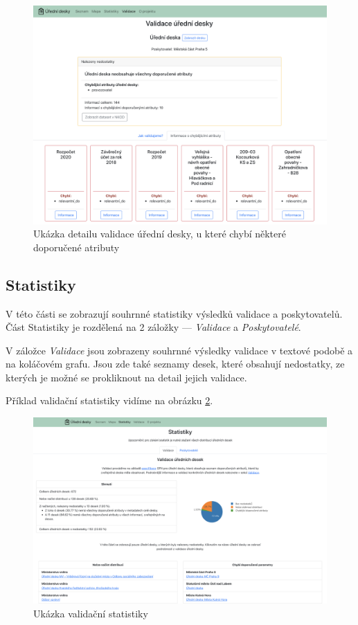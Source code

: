 \begin{figure}
\centering
\includegraphics[width=\textwidth]{cs/obrazky/screenshots/validace_detail_zluty.png}
\caption{Ukázka detailu validace úřední desky, u které chybí některé doporučené atributy}
\label{fig:screen-validace-z}
\end{figure}

\subsection*{Statistiky}\label{statistiky}

V této části se zobrazují souhrnné statistiky výsledků validace a
poskytovatelů. Část Statistiky je rozdělená na 2 záložky --- \textit{Validace} a \textit{Poskytovatelé}.

V záložce \textit{Validace} jsou zobrazeny souhrnné výsledky validace v textové podobě a na koláčovém grafu. Jsou zde také seznamy desek, které obsahují nedostatky, ze kterých je možné se prokliknout na detail jejich validace.

Příklad validační statistiky vidíme na obrázku \ref{fig:screen-stat-val}.

\begin{figure}
\centering
\includegraphics[width=\textwidth]{cs/obrazky/screenshots/statistika_validace.png}
\caption{Ukázka validační statistiky}
\label{fig:screen-stat-val}
\end{figure}

